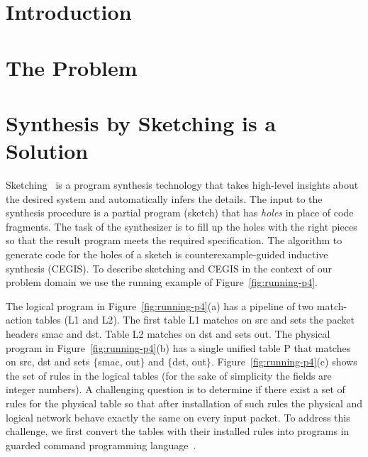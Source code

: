 \lstset{language=C}

\section{Introduction}


\section{The Problem}

\section{Synthesis by Sketching is a Solution}


Sketching~\cite{armando-thesis,armando2013sketch} is a program synthesis technology that 
takes high-level insights about the desired system and automatically infers the details.
The input to the synthesis procedure is a partial program (sketch) that has {\em holes}
in place of code fragments.
The task of the synthesizer is to fill up the holes with the right pieces so that the 
result program meets the required specification.  
The algorithm to generate code for the holes of a sketch is counterexample-guided inductive synthesis (CEGIS).
To describe sketching and CEGIS in the context of our problem domain we use the running 
example of Figure~\ref{fig:running-p4}.




The logical program in Figure~\ref{fig:running-p4}(a) has a pipeline of two match-action 
tables ({\ttfamily L1} and {\ttfamily L2}).
The first table {\ttfamily L1} matches on {\ttfamily src} and sets the packet headers
{\ttfamily smac} and {\ttfamily dst}.
Table {\ttfamily L2} matches on {\ttfamily dst} and sets {\ttfamily out}.
The physical program in Figure~\ref{fig:running-p4}(b) has a single unified table {\ttfamily P}
that matches on {\ttfamily src}, {\ttfamily dst} and sets $\{${\ttfamily smac}, {\ttfamily out}$\}$
and $\{${\ttfamily dst}, {\ttfamily out}$\}$.
Figure~\ref{fig:running-p4}(c) shows the set of rules in the logical tables
(for the sake of simplicity the fields are integer numbers).
A challenging question is to determine if there exist a set of rules for the physical table 
so that after installation of such rules the physical and logical network 
behave exactly the same on every input packet.
To address this challenge, we first convert the tables with their installed rules into programs
in guarded command programming language~\cite{dijkstra1975}.

